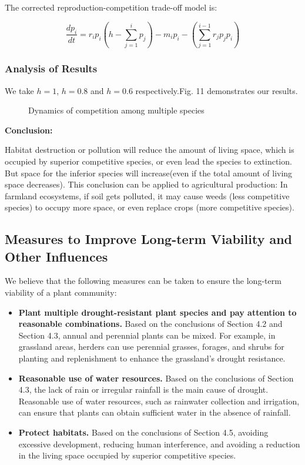 \documentclass{mcmthesis}
\begin{document}
The corrected reproduction-competition trade-off model is:

\begin{equation}
	\label{eq12}
	\frac{dp_i}{dt}=r_ip_i(h-\sum_{j=1}^{i}{p_j})-m_ip_i-
(\sum_{j=1}^{i-1}{r_jp_jp_i})
\end{equation}

\subsubsection{Analysis of Results}
\qquad
We take $h=1$, $h=0.8$ and $h=0.6$ respectively.Fig. 11 demonstrates our results.

\begin{figure}[h]\label{4.5}
	\centering
	\caption{Dynamics of competition among multiple species} 
\end{figure}

\textbf{Conclusion:}

Habitat destruction or pollution will reduce the amount of living space, which is occupied by superior competitive species, or even lead the species to extinction. But  space for the inferior species will increase(even if the total amount of living space decreases). This conclusion can be applied to agricultural production: In farmland ecosystems, if soil gets polluted, it may cause weeds (less competitive species) to occupy more space, or even replace crops (more competitive species).

\subsection{Measures to Improve Long-term Viability and Other Influences}

We believe that the following measures can be taken to ensure the long-term viability of a plant community:

\begin{itemize}
	\item \textbf{Plant multiple drought-resistant plant species and pay attention to reasonable combinations.} Based on the conclusions of Section 4.2 and Section 4.3, annual and perennial plants can be mixed. For example, in grassland areas, herders can use perennial grasses, forages, and shrubs for planting and replenishment to enhance the grassland's drought resistance.
	
	\item \textbf{Reasonable use of water resources.} Based on the conclusions of Section 4.3, the lack of rain or irregular rainfall is the main cause of drought. Reasonable use of water resources, such as rainwater collection and irrigation, can ensure that plants can obtain sufficient water in the absence of rainfall.
	
	\item \textbf{Protect habitats.} Based on the conclusions of Section 4.5, avoiding excessive development, reducing human interference, and avoiding a reduction in the living space occupied by superior competitive species.
\end{itemize}
\end{document}
